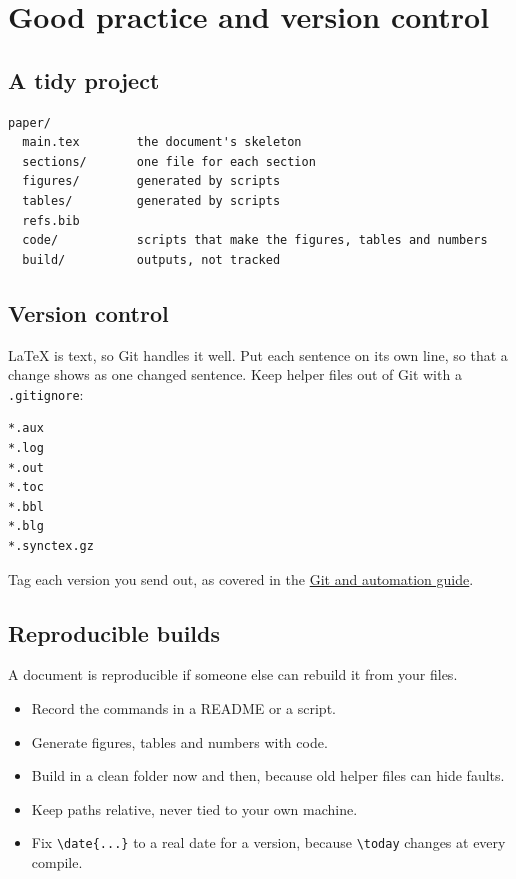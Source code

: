 \chapter{Good practice and version control}
\label{ch:practice}

\section{A tidy project}\label{a-tidy-project}

\begin{lstlisting}[language=text]
paper/
  main.tex        the document's skeleton
  sections/       one file for each section
  figures/        generated by scripts
  tables/         generated by scripts
  refs.bib
  code/           scripts that make the figures, tables and numbers
  build/          outputs, not tracked
\end{lstlisting}

\section{Version control}\label{version-control}

LaTeX is text, so Git handles it well. Put each sentence on its own line, so that a change shows as one changed sentence. Keep helper files out of Git with a \texttt{.gitignore}:

\begin{lstlisting}[language=text]
*.aux
*.log
*.out
*.toc
*.bbl
*.blg
*.synctex.gz
\end{lstlisting}

Tag each version you send out, as covered in the \href{../../git-ci/}{Git and automation guide}.

\section{Reproducible builds}\label{reproducible-builds}

A document is reproducible if someone else can rebuild it from your files.

\begin{itemize}
\tightlist
\item
  Record the commands in a README or a script.
\item
  Generate figures, tables and numbers with code.
\item
  Build in a clean folder now and then, because old helper files can hide faults.
\item
  Keep paths relative, never tied to your own machine.
\item
  Fix \texttt{\textbackslash{}date\{...\}} to a real date for a version, because \texttt{\textbackslash{}today} changes at every compile.
\end{itemize}

